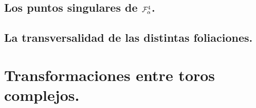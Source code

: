 \documentclass[10pt]{book}
\theoremstyle{definition}
\begin{document}
     	    

  	\section{Los puntos singulares de $\Fol[4]{\alpha}$.}

     	       
     	    
     	    

        \section{La transversalidad de las distintas foliaciones.}

            

\appendix
\chapter{Transformaciones entre toros complejos.}
\label{ApendiceToros}        
            


\end{document}
